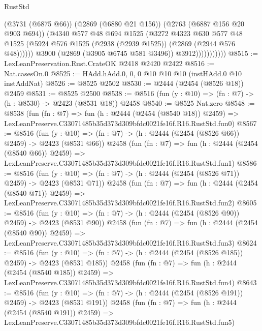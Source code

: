 \begin{lexlean}{RustStd}
\begin{coremodule}
                            (@3731 (@6875 @66))
                            (@2869 (@6880 @21 @156))
                            (@2763 (@6887 @156 @20 @903 @694))
                            (@4340
                              @577
                              @48
                              @694
                              @1525
                              (@3272
                                @4323
                                @630
                                @577
                                @48
                                @1525
                                (@5924 @576 @1525 (@2938 (@2939 @1525)) (@2869 (@2944 @576 @48))))))
                          @3900
                          (@2869 (@3905 @6745 @581 @3496))
                          @3912)))))))))))
@8515 := LexLeanPreservation.Rust.CrateOK @2418 @2420 @2422
@8516 := Nat.casesOn.{0}
@8525 := HAdd.hAdd.{0, 0, 0} @10 @10 @10 (instHAdd.{0} @10 instAddNat)
@8526 := @8525 @2502
@8530 := @2444 (@2454 (@8526 @18)) @2459
@8531 := @8525 @2500
@8538 := @8516 (fun (y : @10) => (fn : @7) -> (h : @8530) -> @2423 (@8531 @18)) @2458
@8540 := @8525 Nat.zero
@8548 := @8538
    (fun (fn : @7) =>
    fun (h : @2444 (@2454 (@8540 @18)) @2459) =>
    LexLeanPreserve.C33071485b35d373d309bfdc0021fe16f.R16.RustStd.fun0)
@8567 := @8516
    (fun (y : @10) => (fn : @7) -> (h : @2444 (@2454 (@8526 @66)) @2459) -> @2423 (@8531 @66))
    @2458
    (fun (fn : @7) =>
    fun (h : @2444 (@2454 (@8540 @66)) @2459) =>
    LexLeanPreserve.C33071485b35d373d309bfdc0021fe16f.R16.RustStd.fun1)
@8586 := @8516
    (fun (y : @10) => (fn : @7) -> (h : @2444 (@2454 (@8526 @71)) @2459) -> @2423 (@8531 @71))
    @2458
    (fun (fn : @7) =>
    fun (h : @2444 (@2454 (@8540 @71)) @2459) =>
    LexLeanPreserve.C33071485b35d373d309bfdc0021fe16f.R16.RustStd.fun2)
@8605 := @8516
    (fun (y : @10) => (fn : @7) -> (h : @2444 (@2454 (@8526 @90)) @2459) -> @2423 (@8531 @90))
    @2458
    (fun (fn : @7) =>
    fun (h : @2444 (@2454 (@8540 @90)) @2459) =>
    LexLeanPreserve.C33071485b35d373d309bfdc0021fe16f.R16.RustStd.fun3)
@8624 := @8516
    (fun (y : @10) => (fn : @7) -> (h : @2444 (@2454 (@8526 @185)) @2459) -> @2423 (@8531 @185))
    @2458
    (fun (fn : @7) =>
    fun (h : @2444 (@2454 (@8540 @185)) @2459) =>
    LexLeanPreserve.C33071485b35d373d309bfdc0021fe16f.R16.RustStd.fun4)
@8643 := @8516
    (fun (y : @10) => (fn : @7) -> (h : @2444 (@2454 (@8526 @191)) @2459) -> @2423 (@8531 @191))
    @2458
    (fun (fn : @7) =>
    fun (h : @2444 (@2454 (@8540 @191)) @2459) =>
    LexLeanPreserve.C33071485b35d373d309bfdc0021fe16f.R16.RustStd.fun5)

\end{coremodule}
\end{lexlean}
